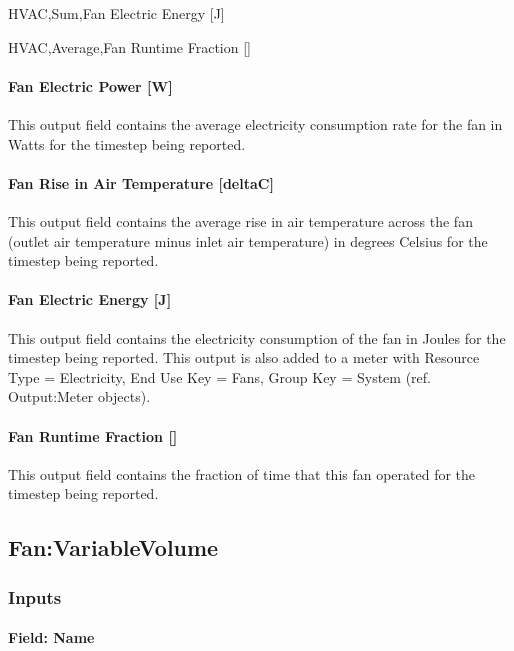 HVAC,Sum,Fan Electric Energy {[}J{]}

HVAC,Average,Fan Runtime Fraction {[]}

\paragraph{Fan Electric Power {[}W{]}}\label{fan-electric-power-w-1}

This output field contains the average electricity consumption rate for the fan in Watts for the timestep being reported.

\paragraph{Fan Rise in Air Temperature {[}deltaC{]}}\label{fan-rise-in-air-temperature-deltac-1}

This output field contains the average rise in air temperature across the fan (outlet air temperature minus inlet air temperature) in degrees Celsius for the timestep being reported.

\paragraph{Fan Electric Energy {[}J{]}}\label{fan-electric-energy-j-1}

This output field contains the electricity consumption of the fan in Joules for the timestep being reported. This output is also added to a meter with Resource Type = Electricity, End Use Key = Fans, Group Key = System (ref. Output:Meter objects).

\paragraph{Fan Runtime Fraction {[]}}\label{fan-runtime-fraction}

This output field contains the fraction of time that this fan operated for the timestep being reported.

\subsection{Fan:VariableVolume}\label{fanvariablevolume}

\subsubsection{Inputs}\label{inputs-2-016}

\paragraph{Field: Name}\label{field-name-2-015}

